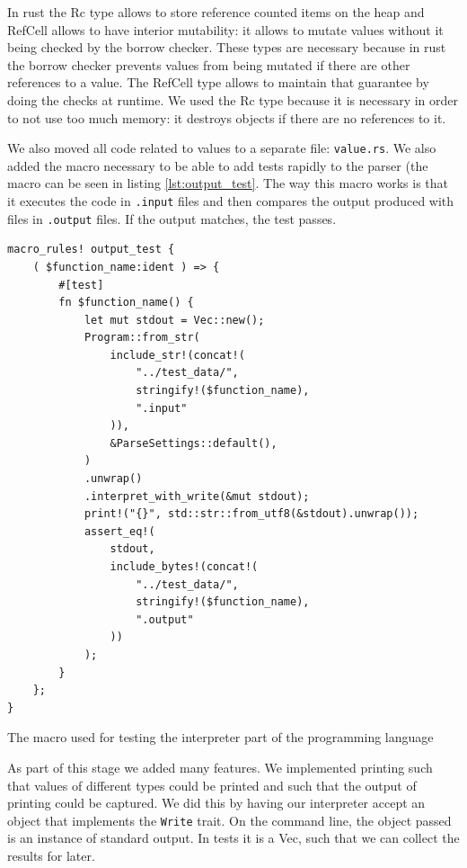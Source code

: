 \documentclass{article}
\begin{document}
In rust the Rc type allows to store reference counted items on the heap and
RefCell allows to have interior mutability: it allows to mutate values without
it being checked by the borrow checker. These types are necessary because in
rust the borrow checker prevents values from being mutated if there are other
references to a value. The RefCell type allows to maintain that guarantee by
doing the checks at runtime. We used the Rc type because it is necessary in
order to not use too much memory: it destroys objects if there are no
references to it.

We also moved all code related to values to a separate file: \texttt{value.rs}.
We also added the macro necessary to be able to add tests rapidly to the parser
(the macro can be seen in listing \ref{lst:output_test}. The way this macro
works is that it executes the code in \texttt{.input} files and then compares
the output produced with files in \texttt{.output} files. If the output
matches, the test passes.

\begin{listing}
	\begin{verbatim}
macro_rules! output_test {
    ( $function_name:ident ) => {
        #[test]
        fn $function_name() {
            let mut stdout = Vec::new();
            Program::from_str(
                include_str!(concat!(
                    "../test_data/",
                    stringify!($function_name),
                    ".input"
                )),
                &ParseSettings::default(),
            )
            .unwrap()
            .interpret_with_write(&mut stdout);
            print!("{}", std::str::from_utf8(&stdout).unwrap());
            assert_eq!(
                stdout,
                include_bytes!(concat!(
                    "../test_data/",
                    stringify!($function_name),
                    ".output"
                ))
            );
        }
    };
}
	\end{verbatim}
	\caption{The macro used for testing the interpreter part of the programming
	language}
	\label{lst:output_test}
\end{listing}

As part of this stage we added many features. We implemented printing such that
values of different types could be printed and such that the output of printing
could be captured. We did this by having our interpreter accept an object that
implements the \texttt{Write} trait. On the command line, the object passed is
an instance of standard output. In tests it is a Vec, such that we can collect
the results for later.
\end{document}
